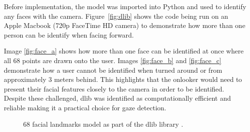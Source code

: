\documentclass[12pt]{article}
\theoremstyle{plain}
\theoremstyle{definition}
\begin{document}
Before implementation, the model was imported into Python and used to identify any faces with the camera. Figure~\ref{fig:dlib} shows the code being run on an Apple Macbook (720p FaceTime HD camera) to demonstrate how more than one person can be identify when facing forward.

Image \ref{fig:face_a} shows how more than one face can be identified at once where all 68 points are drawn onto the user. Images \ref{fig:face_b} and \ref{fig:face_c} demonstrate how a user cannot be identified when turned around or from approximately 3 meters behind. This highlights that the onlooker would need to present their facial features closely to the camera in order to be identified. Despite these challenged, dlib was identified as computationally efficient and reliable making it a practical choice for gaze detection.


\begin{figure}[h!]
\centering
{}

\caption{68 facial landmarks model as part of the dlib library \cite{noauthor_dlib_nodate}. }
\label{fig:facial-landmarks}
\end{figure}
\end{document}
